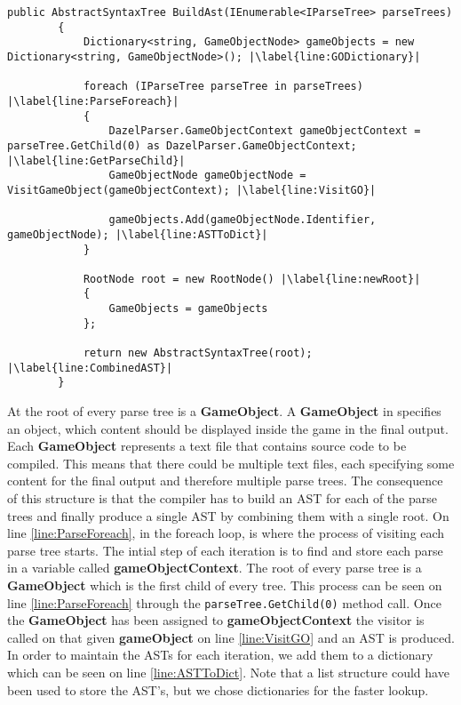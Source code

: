 \begin{lstlisting}[caption={The BuildAst method}, label={lst:BuildAstMethod},escapechar=|]
    public AbstractSyntaxTree BuildAst(IEnumerable<IParseTree> parseTrees)
        {
            Dictionary<string, GameObjectNode> gameObjects = new Dictionary<string, GameObjectNode>(); |\label{line:GODictionary}|
            
            foreach (IParseTree parseTree in parseTrees) |\label{line:ParseForeach}|
            {
                DazelParser.GameObjectContext gameObjectContext = parseTree.GetChild(0) as DazelParser.GameObjectContext; |\label{line:GetParseChild}|
                GameObjectNode gameObjectNode = VisitGameObject(gameObjectContext); |\label{line:VisitGO}|
                
                gameObjects.Add(gameObjectNode.Identifier, gameObjectNode); |\label{line:ASTToDict}|
            }

            RootNode root = new RootNode() |\label{line:newRoot}|
            {
                GameObjects = gameObjects
            };
            
            return new AbstractSyntaxTree(root); |\label{line:CombinedAST}|
        }
\end{lstlisting}

At the root of every parse tree is a \textbf{GameObject}. A \textbf{GameObject} in \dazel{} specifies an object, which content should be displayed inside the game in the final output. Each \textbf{GameObject} represents a text file that contains source code to be compiled. This means that there could be multiple text files, each specifying some content for the final output and therefore multiple parse trees. 
The consequence of this structure is that the compiler has to build an AST for each of the parse trees and finally produce a single AST by combining them with a single root. On line \ref{line:ParseForeach}, in the foreach loop, is where the process of visiting each parse tree starts. 
The intial step of each iteration is to find and store each parse in a variable called \textbf{gameObjectContext}. The root of every parse tree is a \textbf{GameObject} which is the first child of every tree. This process can be seen on line \ref{line:ParseForeach} through the \texttt{parseTree.GetChild(0)} method call.
Once the \textbf{GameObject} has been assigned to \textbf{gameObjectContext} the visitor is called on that given \textbf{gameObject} on line \ref{line:VisitGO} and an AST is produced. 
In order to maintain the ASTs for each iteration, we add them to a dictionary which can be seen on line \ref{line:ASTToDict}. 
Note that a list structure could have been used to store the AST's, but we chose dictionaries for the faster lookup.

